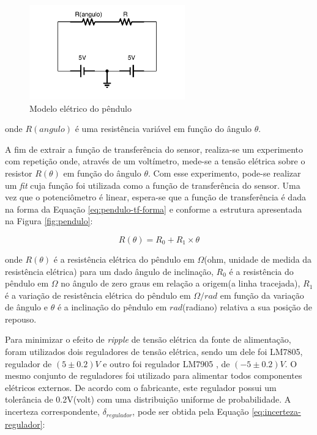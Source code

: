 \documentclass[a4paper]{instrumentacao}
\begin{document}
\begin{figure}[H]
\centering
\includegraphics[width=0.6\textwidth]{Pendulo-Circuito.pdf}
\caption{Modelo elétrico do pêndulo}
\label{fig:pendulo-equivalente}
\end{figure}

\noindent
onde $R(angulo)$ é uma resistência variável em função do ângulo $\theta$.

A fim de extrair a função de transferência do sensor, realiza-se um experimento com repetição onde, através de um voltímetro, mede-se a tensão elétrica sobre o resistor $R(\theta)$ em função do ângulo $\theta$. Com esse experimento, pode-se realizar um \textit{fit} cuja função foi utilizada como a função de transferência do sensor. Uma vez que o potenciômetro é linear, espera-se que a função de transferência é dada na forma da Equação \ref{eq:pendulo-tf-forma} e conforme a estrutura apresentada na Figura \ref{fig:pendulo}:

\begin{equation}
	R(\theta) = R_0 + R_1 \times \theta
	\label{eq:pendulo-tf-forma}
\end{equation}

\noindent
onde $R(\theta)$ é a resistência elétrica do pêndulo em $\Omega$(ohm, unidade de medida da resistência elétrica) para um dado ângulo de inclinação, $R_0$ é a resistência do pêndulo em $\Omega$ no ângulo de zero graus em relação a origem(a linha tracejada), $R_1$ é a variação de resistência elétrica do pêndulo em $\Omega / rad$ em função da variação de ângulo e $\theta$ é a inclinação do pêndulo em $rad$(radiano) relativa a sua posição de repouso.

Para minimizar o efeito de \textit{ripple} de tensão elétrica da fonte de alimentação, foram utilizados dois reguladores de tensão elétrica, sendo um dele foi LM7805, regulador de $(5 \pm 0.2)V$\cite{datasheet-lm7805} e outro foi regulador LM7905 , de $(-5 \pm 0.2)V$\cite{datasheet-lm7905}. O mesmo conjunto de reguladores foi utilizado para alimentar todos componentes elétricos externos. De acordo com o fabricante, este regulador possui um tolerância de 0.2V(volt) com uma distribuição uniforme de probabilidade. A incerteza correspondente, $\delta_{regulador}$, pode ser obtida pela Equação \ref{eq:incerteza-regulador}:
\end{document}

